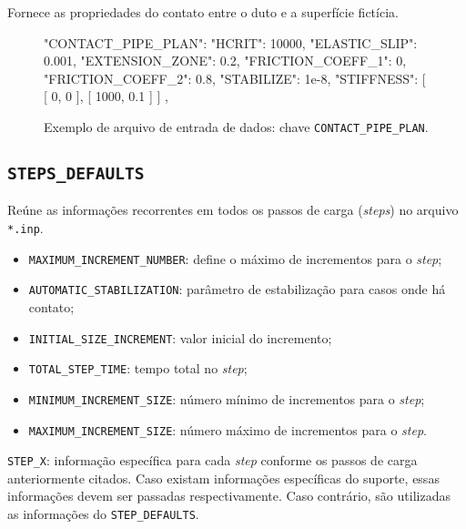 Fornece as propriedades do contato entre o duto e a superfície fictícia.

\begin{figure}
\caption{Exemplo de arquivo de entrada de dados: chave \texttt{CONTACT\_PIPE\_PLAN}.\label{lst:contact_pipe_plan}}
\begin{jsoncode}
{
  "CONTACT_PIPE_PLAN": {
    "HCRIT": 10000,
    "ELASTIC_SLIP": 0.001,
    "EXTENSION_ZONE": 0.2,
    "FRICTION_COEFF_1": 0,
    "FRICTION_COEFF_2": 0.8,
    "STABILIZE": 1e-8,
    "STIFFNESS": [
      [
        0,
        0
      ],
      [
        1000,
        0.1
      ]
    ]
  },
}
\end{jsoncode}
\end{figure}


\subsection{\texttt{STEPS\_DEFAULTS}}

Reúne as informações recorrentes em todos os passos de carga (\textit{steps}) no arquivo \texttt{*.inp}.

\begin{itemize}
  \item \texttt{MAXIMUM\_INCREMENT\_NUMBER}: define o máximo de incrementos para o \textit{step};
  \item \texttt{AUTOMATIC\_STABILIZATION}: parâmetro de estabilização para casos onde há contato;
  \item \texttt{INITIAL\_SIZE\_INCREMENT}: valor inicial do incremento;
  \item \texttt{TOTAL\_STEP\_TIME}: tempo total no \textit{step};
  \item \texttt{MINIMUM\_INCREMENT\_SIZE}: número mínimo de incrementos para o \textit{step};
  \item \texttt{MAXIMUM\_INCREMENT\_SIZE}: número máximo de incrementos para o \textit{step}.
\end{itemize}

\texttt{STEP\_X}: informação específica para cada \textit{step} conforme os passos de carga anteriormente citados. Caso existam informações específicas do suporte, essas informações devem ser passadas respectivamente. Caso contrário, são utilizadas as informações do \texttt{STEP\_DEFAULTS}.

